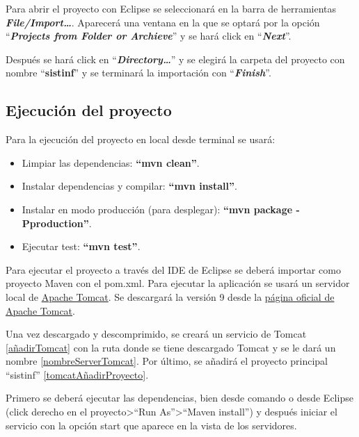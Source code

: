 Para abrir el proyecto con Eclipse se seleccionará en la barra de herramientas \textbf{\textit{File/Import\dots}}. Aparecerá una ventana en la que se optará por la opción ``\textbf{\textit{Projects from Folder or Archieve}}'' y se hará click en ``\textbf{\textit{Next}}''.

Después se hará click en ``\textbf{\textit{Directory\dots}}'' y se elegirá la carpeta del proyecto con nombre ``\textbf{sistinf}'' y se terminará la importación con ``\textbf{\textit{Finish}}''.
	
\subsection{Ejecución del proyecto}

Para la ejecución del proyecto en local desde terminal se usará:
\begin{itemize}
	\item Limpiar las dependencias: \textbf{``mvn clean''}.
	\item Instalar dependencias y compilar: \textbf{``mvn install''}.
	\item Instalar en modo producción (para desplegar): \textbf{``mvn package -Pproduction''}.  
	\item Ejecutar test: \textbf{``mvn test''}.	
\end{itemize}

Para ejecutar el proyecto a través del IDE de Eclipse se deberá importar como proyecto Maven con el pom.xml. Para ejecutar la aplicación se usará un servidor local de \href{https://tomcat.apache.org/download-90.cgi}{Apache Tomcat}. Se descargará la versión 9 desde la  \href{https://tomcat.apache.org/download-90.cgi}{página oficial de Apache Tomcat}. 

Una vez descargado y descomprimido, se creará un servicio de Tomcat \ref{añadirTomcat} con la ruta donde se tiene descargado Tomcat y se le dará un nombre \ref{nombreServerTomcat}. Por último, se añadirá el proyecto principal ``sistinf'' \ref{tomcatAñadirProyecto}.


Primero se deberá ejecutar las dependencias, bien desde comando o desde Eclipse (click derecho en el proyecto>``Run As''>``Maven install'') y después iniciar el servicio con la opción start que aparece en la vista de los servidores. 

